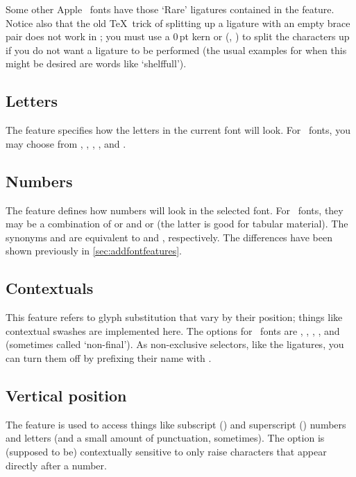 \documentclass[a4paper]{l3doc}
\begin{document}
Some other Apple \AAT\ fonts have those `Rare' ligatures contained in
the  feature. Notice also that the old \TeX\ trick of
splitting up a ligature with an empty brace pair does not work in
\XeTeX; you must use a 0\,pt kern or  (\eg, ) to
split the characters up if you do not want a ligature to be performed (the usual examples for when this might be desired are words like `shelf\null full').

\subsection{Letters} \label{sec:aat-letters}
The  feature specifies how the letters in the current font
will look. For \AAT\ fonts, you may choose from ,
, , , and
.


\subsection{Numbers}
The  feature defines how numbers will look in the
selected font. For \AAT\ fonts, they may be a
combination of  or  and  or
 (the latter is good for tabular material). The synonyms
 and  are equivalent to  and
, respectively. The differences have been shown previously
in \vref{sec:addfontfeatures}.

\subsection{Contextuals} \label{sec:contextuals}
This feature refers to glyph substitution that vary by their position;
things like contextual swashes are implemented here.
The options for \AAT\ fonts are
, , ,
, and  (sometimes called `non-final'). As
non-exclusive selectors, like the ligatures, you can turn them off
by prefixing their name with .

\subsection{Vertical position}
The  feature is used to access things like
subscript () and superscript () numbers and
letters (and a small amount of punctuation, sometimes).
The  option is (supposed to be)
contextually sensitive to only raise characters that appear directly
after a number.
\end{document}
